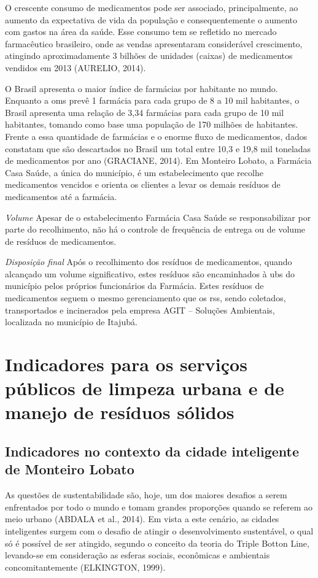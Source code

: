 \begin{description}
	O crescente consumo de medicamentos pode ser associado, principalmente, ao aumento da expectativa de vida da população e consequentemente o aumento com gastos na área da saúde. Esse consumo tem se refletido no mercado farmacêutico brasileiro, onde as vendas apresentaram considerável crescimento, atingindo aproximadamente 3 bilhões de unidades (caixas) de medicamentos vendidos em 2013 (AURELIO, 2014).
	
	O Brasil apresenta o maior índice de farmácias por habitante no mundo. Enquanto a \gls{oms} prevê 1 farmácia para cada grupo de 8 a 10 mil habitantes, o Brasil apresenta uma relação de 3,34 farmácias para cada grupo de 10 mil habitantes, tomando como base uma população de 170 milhões de habitantes. Frente a essa quantidade de farmácias e o enorme fluxo de medicamentos, dados constatam que são descartados no Brasil um total entre 10,3 e 19,8 mil toneladas de medicamentos por ano (GRACIANE, 2014).
	Em Monteiro Lobato, a Farmácia Casa Saúde, a única do município, é um estabelecimento que recolhe medicamentos vencidos e orienta os clientes a levar os demais resíduos de medicamentos até a farmácia.
	
	\subitem \textit{Volume}
	Apesar de o estabelecimento Farmácia Casa Saúde se responsabilizar por parte do recolhimento, não há o controle de frequência de entrega ou de volume de resíduos de medicamentos.
	
	\subitem \textit{Disposição final}
	Após o recolhimento dos resíduos de medicamentos, quando alcançado um volume significativo, estes resíduos são encaminhados à \gls{ubs} do município pelos próprios funcionários da Farmácia.
	Estes resíduos de medicamentos seguem o mesmo gerenciamento que os \gls{rss}, sendo coletados, transportados e incinerados pela empresa AGIT – Soluções Ambientais, localizada no município de Itajubá.
	
\end{description}

\section{Indicadores para os serviços públicos de limpeza urbana e de manejo de resíduos sólidos}

\subsection{Indicadores no contexto da cidade inteligente de Monteiro Lobato}
As questões de sustentabilidade são, hoje, um dos maiores desafios a serem enfrentados por todo o mundo e tomam grandes proporções quando se referem ao meio urbano (ABDALA et al., 2014). Em vista a este cenário, as cidades inteligentes surgem com o desafio de atingir o desenvolvimento sustentável, o qual só é possível de ser atingido, segundo o conceito da teoria do Triple Botton Line, levando-se em consideração as esferas sociais, econômicas e ambientais concomitantemente (ELKINGTON, 1999).

